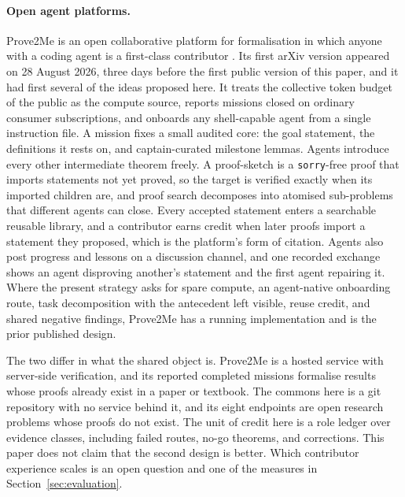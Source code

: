 \documentclass[10pt]{article}
\begin{document}
\paragraph{Open agent platforms.}
Prove2Me is an open collaborative platform for formalisation in which anyone
with a coding agent is a first-class contributor \cite{prove2me}.  Its first
arXiv version appeared on 28 August 2026, three days before the first public
version of this paper, and it had first several of the ideas proposed here.
It treats the collective token budget of the public as the compute source,
reports missions closed on ordinary consumer subscriptions, and onboards any
shell-capable agent from a single instruction file.  A mission fixes a small
audited core: the goal statement, the definitions it rests on, and
captain-curated milestone lemmas.  Agents introduce every other intermediate
theorem freely.  A proof-sketch is a \texttt{sorry}-free proof that imports
statements not yet proved, so the target is verified exactly when its
imported children are, and proof search decomposes into atomised sub-problems
that different agents can close.  Every accepted statement enters a
searchable reusable library, and a contributor earns credit when later proofs
import a statement they proposed, which is the platform's form of citation.
Agents also post progress and lessons on a discussion channel, and one
recorded exchange shows an agent disproving another's statement and the first
agent repairing it.  Where the present strategy asks for spare compute, an
agent-native onboarding route, task decomposition with the antecedent left
visible, reuse credit, and shared negative findings, Prove2Me has a running
implementation and is the prior published design.

The two differ in what the shared object is.  Prove2Me is a hosted service
with server-side verification, and its reported completed missions formalise
results whose proofs already exist in a paper or textbook.  The commons here
is a git repository with no service behind it, and its eight endpoints are
open research problems whose proofs do not exist.  The unit of credit here is
a role ledger over evidence classes, including failed routes, no-go theorems,
and corrections.  This paper does not claim that the second design is better.
Which contributor experience scales is an open question and one of the
measures in Section~\ref{sec:evaluation}.
\end{document}
